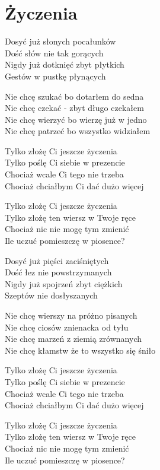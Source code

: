 \section{Życzenia}
\begin{text}
Dosyć już słonych pocałunków\\
Dość słów nie tak gorących\\
Nigdy już dotknięć zbyt płytkich\\
Gestów w pustkę płynących

Nie chcę szukać bo dotarłem do sedna\\
Nie chcę czekać - zbyt długo czekałem\\
Nie chcę wierzyć bo wierzę już w jedno\\
Nie chcę patrzeć bo wszystko widziałem

Tylko złożę Ci jeszcze życzenia\\
Tylko poślę Ci siebie w prezencie\\
Chociaż wcale Ci tego nie trzeba\\
Chociaż chciałbym Ci dać dużo więcej

Tylko złożę Ci jeszcze życzenia\\
Tylko złożę ten wiersz w Twoje ręce\\
Chociaż nic nie mogę tym zmienić\\
Ile uczuć pomieszczę w piosence?

Dosyć już pięści zaciśniętych\\
Dość łez nie powstrzymanych\\
Nigdy już spojrzeń zbyt ciężkich\\
Szeptów nie dosłyszanych

Nie chcę wierszy na próżno pisanych\\
Nie chcę ciosów znienacka od tyłu\\
Nie chcę marzeń z ziemią zrównanych\\
Nie chcę kłamstw że to wszystko się śniło

Tylko złożę Ci jeszcze życzenia\\
Tylko poślę Ci siebie w prezencie\\
Chociaż wcale Ci tego nie trzeba\\
Chociaż chciałbym Ci dać dużo więcej

Tylko złożę Ci jeszcze życzenia\\
Tylko złożę ten wiersz w Twoje ręce\\
Chociaż nic nie mogę tym zmienić\\
Ile uczuć pomieszczę w piosence?
\end{text}